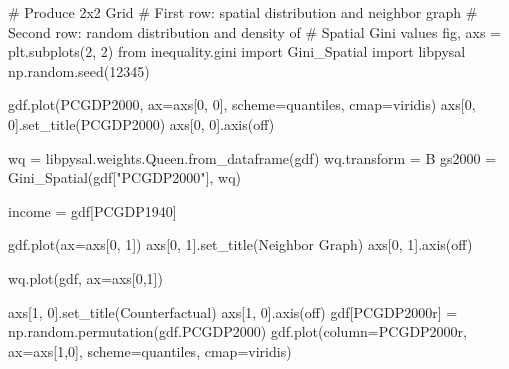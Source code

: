 \documentclass[
  a4paper, 
  twoside,
  final
]{article}
\newenvironment{Shaded}{\begin{snugshade}}{\end{snugshade}}
\newcommand{\CommentTok}[1]{\textcolor[rgb]{0.37,0.37,0.37}{#1}}
\newcommand{\DecValTok}[1]{\textcolor[rgb]{0.68,0.00,0.00}{#1}}
\newcommand{\ImportTok}[1]{\textcolor[rgb]{0.00,0.46,0.62}{#1}}
\newcommand{\NormalTok}[1]{\textcolor[rgb]{0.00,0.23,0.31}{#1}}
\newcommand{\OperatorTok}[1]{\textcolor[rgb]{0.37,0.37,0.37}{#1}}
\newcommand{\StringTok}[1]{\textcolor[rgb]{0.13,0.47,0.30}{#1}}
\begin{document}
\begin{Shaded}
\begin{Highlighting}[]
\CommentTok{\# Produce 2x2 Grid}
\CommentTok{\# First row: spatial distribution and neighbor graph}
\CommentTok{\# Second row: random distribution and density of}
\CommentTok{\# Spatial Gini values}
\NormalTok{fig, axs }\OperatorTok{=}\NormalTok{ plt.subplots(}\DecValTok{2}\NormalTok{, }\DecValTok{2}\NormalTok{)}
\ImportTok{from}\NormalTok{ inequality.gini }\ImportTok{import}\NormalTok{ Gini\_Spatial}
\ImportTok{import}\NormalTok{ libpysal}
\NormalTok{np.random.seed(}\DecValTok{12345}\NormalTok{)}


\NormalTok{gdf.plot(}\StringTok{\textquotesingle{}PCGDP2000\textquotesingle{}}\NormalTok{, ax}\OperatorTok{=}\NormalTok{axs[}\DecValTok{0}\NormalTok{, }\DecValTok{0}\NormalTok{], scheme}\OperatorTok{=}\StringTok{\textquotesingle{}quantiles\textquotesingle{}}\NormalTok{, cmap}\OperatorTok{=}\StringTok{\textquotesingle{}viridis\textquotesingle{}}\NormalTok{)}
\NormalTok{axs[}\DecValTok{0}\NormalTok{, }\DecValTok{0}\NormalTok{].set\_title(}\StringTok{\textquotesingle{}PCGDP2000\textquotesingle{}}\NormalTok{)}
\NormalTok{axs[}\DecValTok{0}\NormalTok{, }\DecValTok{0}\NormalTok{].axis(}\StringTok{\textquotesingle{}off\textquotesingle{}}\NormalTok{)}


\NormalTok{wq }\OperatorTok{=}\NormalTok{ libpysal.weights.Queen.from\_dataframe(gdf)}
\NormalTok{wq.transform }\OperatorTok{=} \StringTok{\textquotesingle{}B\textquotesingle{}}
\NormalTok{gs2000 }\OperatorTok{=}\NormalTok{ Gini\_Spatial(gdf[}\StringTok{"PCGDP2000"}\NormalTok{], wq)}

\NormalTok{income }\OperatorTok{=}\NormalTok{ gdf[}\StringTok{\textquotesingle{}PCGDP1940\textquotesingle{}}\NormalTok{]}

\NormalTok{gdf.plot(ax}\OperatorTok{=}\NormalTok{axs[}\DecValTok{0}\NormalTok{, }\DecValTok{1}\NormalTok{])}
\NormalTok{axs[}\DecValTok{0}\NormalTok{, }\DecValTok{1}\NormalTok{].set\_title(}\StringTok{\textquotesingle{}Neighbor Graph\textquotesingle{}}\NormalTok{)}
\NormalTok{axs[}\DecValTok{0}\NormalTok{, }\DecValTok{1}\NormalTok{].axis(}\StringTok{\textquotesingle{}off\textquotesingle{}}\NormalTok{)}


\NormalTok{wq.plot(gdf, ax}\OperatorTok{=}\NormalTok{axs[}\DecValTok{0}\NormalTok{,}\DecValTok{1}\NormalTok{])}

\NormalTok{axs[}\DecValTok{1}\NormalTok{, }\DecValTok{0}\NormalTok{].set\_title(}\StringTok{\textquotesingle{}Counterfactual\textquotesingle{}}\NormalTok{)}
\NormalTok{axs[}\DecValTok{1}\NormalTok{, }\DecValTok{0}\NormalTok{].axis(}\StringTok{\textquotesingle{}off\textquotesingle{}}\NormalTok{)}
\NormalTok{gdf[}\StringTok{\textquotesingle{}PCGDP2000r\textquotesingle{}}\NormalTok{] }\OperatorTok{=}\NormalTok{ np.random.permutation(gdf.PCGDP2000)}
\NormalTok{gdf.plot(column}\OperatorTok{=}\StringTok{\textquotesingle{}PCGDP2000r\textquotesingle{}}\NormalTok{, ax}\OperatorTok{=}\NormalTok{axs[}\DecValTok{1}\NormalTok{,}\DecValTok{0}\NormalTok{], scheme}\OperatorTok{=}\StringTok{\textquotesingle{}quantiles\textquotesingle{}}\NormalTok{,}
\NormalTok{         cmap}\OperatorTok{=}\StringTok{\textquotesingle{}viridis\textquotesingle{}}\NormalTok{)}


\end{Highlighting}
\end{Shaded}
\end{document}
